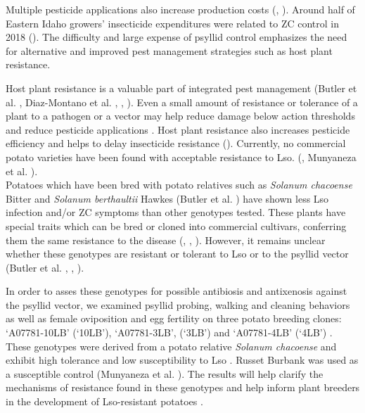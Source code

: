 \documentclass{UIdahoMastersThesis}
\begin{document}
Multiple pesticide applications also increase production costs (\cite{Greenway2014}, \cite{Guenthner2012}). Around half of Eastern Idaho growers’ insecticide expenditures were related to ZC control in 2018 (\cite{Greenway2018}). The difficulty and large expense of psyllid control emphasizes the need for alternative and improved pest management strategies such as host plant resistance.

Host plant resistance is a valuable part of integrated pest management (Butler et al. \citeyear{Butler2012a}, Diaz-Montano et al. \citeyear{Diaz-Montano2013}, \cite{Kogan1988}, \cite{Munyaneza2012b}). Even a small amount of resistance or tolerance of a plant to a pathogen or a vector may help reduce damage below action thresholds and reduce pesticide applications \autocite{Kennedy1987}. Host plant resistance also increases pesticide efficiency and helps to delay insecticide resistance (\cite{Gharalari2009}). Currently, no commercial potato varieties have been found with acceptable resistance to Lso. (\cite{Anderson2012}, Munyaneza et al. \citeyear{Munyaneza2011}).\\ Potatoes which have been bred with potato relatives such as \textit{Solanum chacoense} Bitter \autocite{Rashidi2017} and \textit{Solanum berthaultii} Hawkes (Butler et al. \citeyear{Butler2011}) have shown less Lso infection and/or ZC symptoms than other genotypes tested. These plants have special traits which can be bred or cloned into commercial cultivars, conferring them the same resistance to the disease (\cite{Casteel2006}, \citeyear{Casteel2007}, \cite{Kaloshian2004}). However, it remains unclear whether these genotypes are resistant or tolerant to Lso or to the psyllid vector (Butler et al. \citeyear{Butler2011}, \cite{Putten2001}, \cite{Kennedy1987}). 

In order to asses these genotypes for possible antibiosis and antixenosis against the psyllid vector, we examined psyllid probing, walking and cleaning behaviors as well as female oviposition and egg fertility on three potato breeding clones: ‘A07781-10LB’ (‘10LB’), ‘A07781-3LB’, (‘3LB’) and ‘A07781-4LB’ (‘4LB’) \autocite{Rashidi2017}. These genotypes were derived from a potato relative \textit{Solanum chacoense} and exhibit high tolerance and low susceptibility to Lso \autocite{Rashidi2017}. Russet Burbank was used as a susceptible control (Munyaneza et al. \citeyear{Munyaneza2011}). The results will help clarify the mechanisms of resistance found in these genotypes and help inform plant breeders in the development of Lso-resistant potatoes \autocite{Kennedy1987}. 
\\
\end{document}
